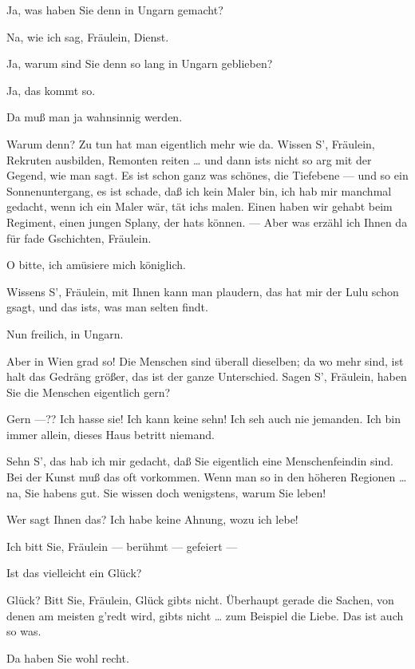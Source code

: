\documentclass[
	final,
	a4paper,
	ngerman,
	mpinclude = true, %
	twoside = true,
	open = right,
	cleardoublepage = plain,
	DIV = 13,
	BCOR = 1cm,
	titlepage = firstiscover,
	]{scrbook}
\newcommand{\thecharacter}[1]{\textup{\textsc{#1}}}
\newcommand{\theschauspielerin}{\thecharacter{Schauspielerin}}
\newcommand{\thegraf}{\thecharacter{Graf}}
\newcommand{\character}[1]{\item[#1:]}
\newcommand{\schauspielerin}{\character{\theschauspielerin}}
\newcommand{\graf}{\character{\thegraf}}
\begin{document}
\begin{play}
	\schauspielerin
	Ja, was haben Sie denn in Ungarn gemacht?

	\graf
	Na, wie ich sag, Fräulein, Dienst.

	\schauspielerin
	Ja, warum sind Sie denn so lang in Ungarn geblieben?

	\graf
	Ja, das kommt so.

	\schauspielerin
	Da muß man ja wahnsinnig werden.

	\graf
	Warum denn? Zu tun hat man eigentlich mehr wie da. Wissen S', Fräulein, Rekruten ausbilden, Remonten reiten \ldots{} und dann ists nicht so arg mit der Gegend, wie man sagt. Es ist schon ganz was schönes, die Tiefebene --- und so ein Sonnenuntergang, es ist schade, daß ich kein Maler bin, ich hab mir manchmal gedacht, wenn ich ein Maler wär, tät ichs malen. Einen haben wir gehabt beim Regiment, einen jungen Splany, der hats können. --- Aber was erzähl ich Ihnen da für fade Gschichten, Fräulein.

	\schauspielerin
	O bitte, ich amüsiere mich königlich.

	\graf
	Wissens S', Fräulein, mit Ihnen kann man plaudern, das hat mir der Lulu schon gsagt, und das ists, was man selten findt.

	\schauspielerin
	Nun freilich, in Ungarn.

	\graf
	Aber in Wien grad so! Die Menschen sind überall dieselben; da wo mehr sind, ist halt das Gedräng größer, das ist der ganze Unterschied. Sagen S', Fräulein, haben Sie die Menschen eigentlich gern?

	\schauspielerin
	Gern ---?? Ich hasse sie! Ich kann keine sehn! Ich seh auch nie jemanden. Ich bin immer allein, dieses Haus betritt niemand.

	\graf
	Sehn S', das hab ich mir gedacht, daß Sie eigentlich eine Menschenfeindin sind. Bei der Kunst muß das oft vorkommen. Wenn man so in den höheren Regionen \ldots{} na, Sie habens gut. Sie wissen doch wenigstens, warum Sie leben!

	\schauspielerin
	Wer sagt Ihnen das? Ich habe keine Ahnung, wozu ich lebe!

	\graf
	Ich bitt Sie, Fräulein --- berühmt --- gefeiert ---

	\schauspielerin
	Ist das vielleicht ein Glück?

	\graf
	Glück? Bitt Sie, Fräulein, Glück gibts nicht. Überhaupt gerade die Sachen, von denen am meisten g'redt wird, gibts nicht \ldots{} zum Beispiel die Liebe. Das ist auch so was.

	\schauspielerin
	Da haben Sie wohl recht.


\end{play}
\end{document}
